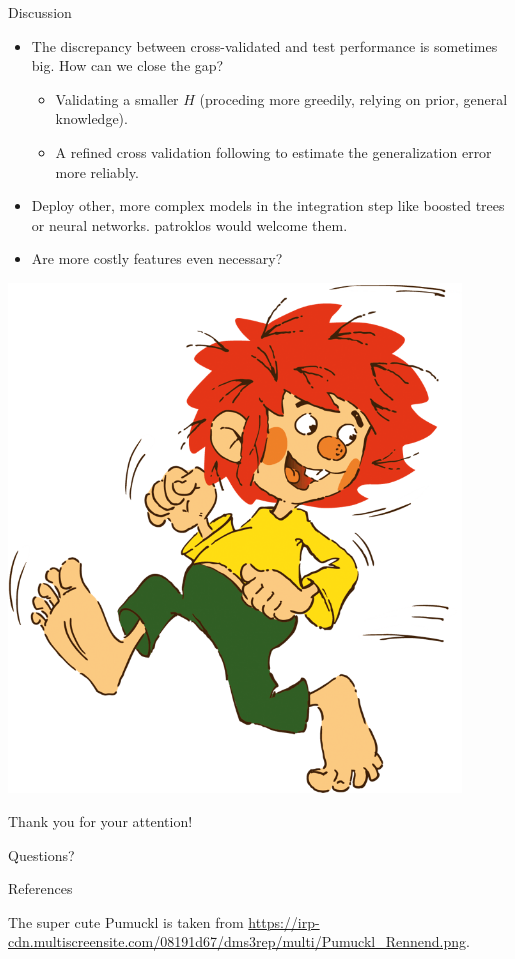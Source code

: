 \documentclass[10pt, aspectratio=169]{beamer}
\begin{document}
\begin{frame}{Discussion}
  \begin{itemize}
    \item The discrepancy between cross-validated and test performance is 
      sometimes big. How can we close the gap? \pause
      \begin{itemize}
        \item Validating a smaller $H$ (proceding more greedily, relying on 
          prior, general knowledge).
        \item A refined cross validation following \citep{nested-cv-hastie} to 
          estimate the generalization error more reliably.
      \end{itemize}
    \pause
    \item Deploy other, more complex models in the integration step like boosted 
      trees or neural networks. patroklos would welcome them.
    \pause
    \item Are more costly features even necessary?
  \end{itemize}
\end{frame}

\begin{frame}[standout]
  \begin{minipage}{0.45\textwidth}
    \centering
    \includegraphics[width=0.9\textwidth]{figs/pumuckl.png}
  \end{minipage}
  \hfill
  \begin{minipage}{0.50\textwidth}
      Thank you for your attention! \par Questions?
  \end{minipage}
\end{frame}

\appendix

\begin{frame}[allowframebreaks]{References}
  
  The super cute Pumuckl is taken from 
  \url{https://irp-cdn.multiscreensite.com/08191d67/dms3rep/multi/Pumuckl_Rennend.png}.
\end{frame}
\end{document}
